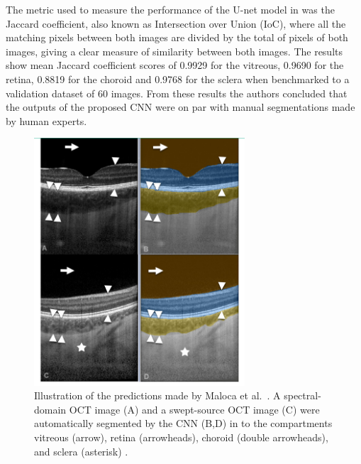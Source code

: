 \documentclass[12pt,a4paper]{scrartcl}
\begin{document}
The metric used to measure the performance of the U-net model in \cite{Maloca2019} was the Jaccard coefficient, also known as Intersection over Union (IoC), where all the matching pixels between both images are divided by the total of pixels of both images, giving a clear measure of similarity between both images. The results show mean Jaccard coefficient scores of 0.9929 for the vitreous, 0.9690 for the retina, 0.8819 for the choroid and 0.9768 for the sclera when benchmarked to a validation dataset of 60 images. From these results the authors concluded that the outputs of the proposed CNN were on par with manual segmentations made by human experts.

\begin{figure}[H]
    \centering
    \includegraphics[width=0.7\textwidth]{./images/maloca-segmentations-results.png}
    \caption{Illustration of the predictions made by Maloca et al.~\cite{Maloca2019}. A spectral-domain OCT image (A) and a swept-source OCT image (C) were automatically segmented by the CNN (B,D) in to the compartments vitreous (arrow), retina (arrowheads), choroid (double arrowheads), and sclera (asterisk) \cite{Maloca2019}.}
\end{figure}
\end{document}
